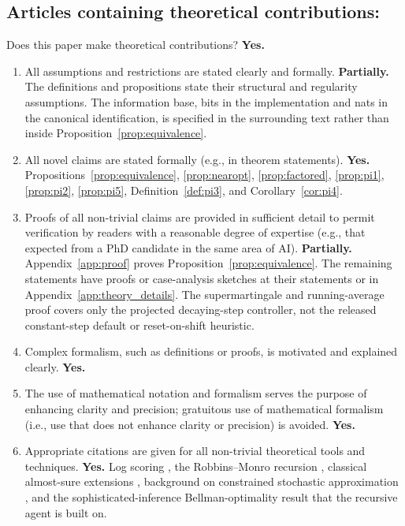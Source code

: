 \documentclass[manuscript, screen, review]{jair}
\begin{document}
\subsection*{Articles containing theoretical contributions:}
Does this paper make theoretical contributions? \textbf{Yes.}
\begin{enumerate}
\item All assumptions and restrictions are stated clearly and formally. \textbf{Partially.} The definitions and propositions state their structural and regularity assumptions. The information base, bits in the implementation and nats in the canonical identification, is specified in the surrounding text rather than inside Proposition~\ref{prop:equivalence}.
\item All novel claims are stated formally (e.g., in theorem statements). \textbf{Yes.} Propositions~\ref{prop:equivalence}, \ref{prop:nearopt}, \ref{prop:factored}, \ref{prop:pi1}, \ref{prop:pi2}, \ref{prop:pi5}, Definition~\ref{def:pi3}, and Corollary~\ref{cor:pi4}.
\item Proofs of all non-trivial claims are provided in sufficient detail to permit verification by readers with a reasonable degree of expertise (e.g., that expected from a PhD candidate in the same area of AI). \textbf{Partially.} Appendix~\ref{app:proof} proves Proposition~\ref{prop:equivalence}. The remaining statements have proofs or case-analysis sketches at their statements or in Appendix~\ref{app:theory_details}. The supermartingale and running-average proof covers only the projected decaying-step controller, not the released constant-step default or reset-on-shift heuristic.
\item Complex formalism, such as definitions or proofs, is motivated and explained clearly. \textbf{Yes.}
\item The use of mathematical notation and formalism serves the purpose of enhancing clarity and precision; gratuitous use of mathematical formalism (i.e., use that does not enhance clarity or precision) is avoided. \textbf{Yes.}
\item Appropriate citations are given for all non-trivial theoretical tools and techniques. \textbf{Yes.} Log scoring \citep{bernardo1979}, the Robbins--Monro recursion \citep{robbins1951}, classical almost-sure extensions \citep{blum1954}, background on constrained stochastic approximation \citep{kushner1978}, and the sophisticated-inference Bellman-optimality result \citep{dacosta2020b} that the recursive agent is built on.
\end{enumerate}
\end{document}
